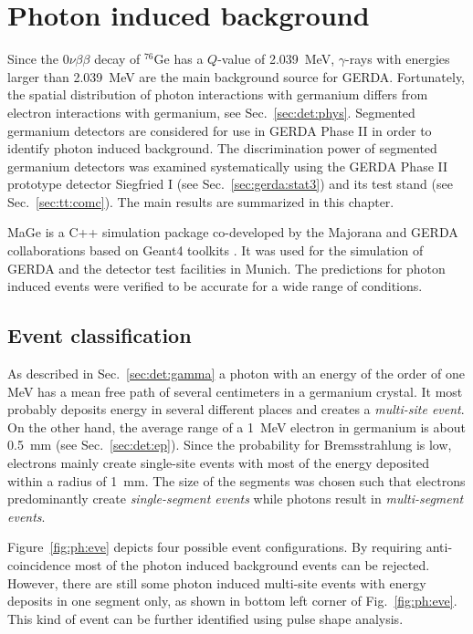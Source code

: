 \chapter{Photon induced background}
\label{cha:photon}
Since the $0\nu\beta\beta$ decay of $^{76}$Ge has a $Q$-value of
2.039~MeV, $\gamma$-rays with energies larger than 2.039~MeV are the
main background source for GERDA. Fortunately, the spatial
distribution of photon interactions with germanium differs from
electron interactions with germanium, see
Sec.~\ref{sec:det:phys}. Segmented germanium detectors are considered
for use in GERDA Phase II in order to identify photon induced
background. The discrimination power of segmented germanium detectors
was examined systematically \cite{Pid07} using the GERDA Phase II
prototype detector Siegfried I (see Sec.~\ref{sec:gerda:stat3}) and
its test stand (see Sec.~\ref{sec:tt:comc}). The main results are
summarized in this chapter.

MaGe \cite{Mag06, Mag08} is a C++ simulation package co-developed by
the Majorana and GERDA collaborations based on Geant4 toolkits
\cite{Gea03, Gea06}. It was used for the simulation of GERDA and the
detector test facilities in Munich. The predictions for photon induced
events were verified to be accurate for a wide range of conditions.

\section{Event classification}
\label{sec:ph:eve}
As described in Sec.~\ref{sec:det:gamma} a photon with an energy of
the order of one MeV has a mean free path of several centimeters in a
germanium crystal. It most probably deposits energy in several
different places and creates a \emph{multi-site event}. On the other
hand, the average range of a 1~MeV electron in germanium is about
0.5~mm (see Sec.~\ref{sec:det:ep}). Since the probability for
Bremsstrahlung is low, electrons mainly create single-site events with
most of the energy deposited within a radius of 1~mm. The size of the
segments was chosen such that electrons predominantly create
\emph{single-segment events} while photons result in
\emph{multi-segment events}.

Figure~\ref{fig:ph:eve} depicts four possible event configurations. By
requiring anti-coincidence most of the photon induced background
events can be rejected. However, there are still some photon induced
multi-site events with energy deposits in one segment only, as shown
in bottom left corner of Fig.~\ref{fig:ph:eve}. This kind of event can
be further identified using pulse shape analysis.


